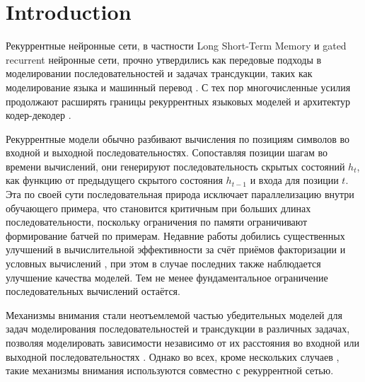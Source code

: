 \documentclass{article}
\begin{document}
\section{Introduction}

Рекуррентные нейронные сети, в частности Long Short-Term Memory \citep{hochreiter1997} и gated recurrent \citep{gruEval14} нейронные сети, прочно утвердились как передовые подходы в моделировании последовательностей и задачах трансдукции, таких как моделирование языка и машинный перевод \citep{sutskever14, bahdanau2014neural, cho2014learning}. С тех пор многочисленные усилия продолжают расширять границы рекуррентных языковых моделей и архитектур кодер-декодер \citep{wu2016google,luong2015effective,jozefowicz2016exploring}.

Рекуррентные модели обычно разбивают вычисления по позициям символов во входной и выходной последовательностях. Сопоставляя позиции шагам во времени вычислений, они генерируют последовательность скрытых состояний $h_t$, как функцию от предыдущего скрытого состояния $h_{t-1}$ и входа для позиции $t$. Эта по своей сути последовательная природа исключает параллелизацию внутри обучающего примера, что становится критичным при больших длинах последовательности, поскольку ограничения по памяти ограничивают формирование батчей по примерам.
Недавние работы добились существенных улучшений в вычислительной эффективности за счёт приёмов факторизации \citep{Kuchaiev2017Factorization} и условных вычислений \citep{shazeer2017outrageously}, при этом в случае последних также наблюдается улучшение качества моделей. Тем не менее фундаментальное ограничение последовательных вычислений остаётся.


Механизмы внимания стали неотъемлемой частью убедительных моделей для задач моделирования последовательностей и трансдукции в различных задачах, позволяя моделировать зависимости независимо от их расстояния во входной или выходной последовательностях \citep{bahdanau2014neural, structuredAttentionNetworks}. Однако во всех, кроме нескольких случаев \citep{decomposableAttnModel}, такие механизмы внимания используются совместно с рекуррентной сетью.

\end{document}
